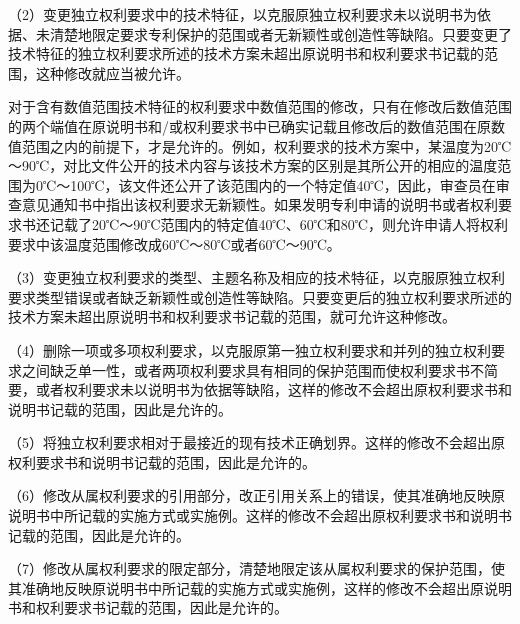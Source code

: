 {\setlength{\parindent}{17.1bp}（2）变更独立权利要求中的技术特征，以克服原独立权利要求未以说明书为依据、未清楚地限定要求专利保护的范围或者无新颖性或创造性等缺陷。只要变更了技术特征的独立权利要求所述的技术方案未超出原说明书和权利要求书记载的范围，这种修改就应当被允许。\par}

对于含有数值范围技术特征的权利要求中数值范围的修改，只有在修改后数值范围的两个端值在原说明书和/或权利要求书中已确实记载且修改后的数值范围在原数值范围之内的前提下，才是允许的。例如，权利要求的技术方案中，某温度为20℃～90℃，对比文件公开的技术内容与该技术方案的区别是其所公开的相应的温度范围为0℃～100℃，该文件还公开了该范围内的一个特定值40℃，因此，审查员在审查意见通知书中指出该权利要求无新颖性。如果发明专利申请的说明书或者权利要求书还记载了20℃～90℃范围内的特定值40℃、60℃和80℃，则允许申请人将权利要求中该温度范围修改成60℃～80℃或者60℃～90℃。

{\setlength{\parindent}{17.1bp}（3）变更独立权利要求的类型、主题名称及相应的技术特征，以克服原独立权利要求类型错误或者缺乏新颖性或创造性等缺陷。只要变更后的独立权利要求所述的技术方案未超出原说明书和权利要求书记载的范围，就可允许这种修改。\par}

{\setlength{\parindent}{17.1bp}（4）删除一项或多项权利要求，以克服原第一独立权利要求和并列的独立权利要求之间缺乏单一性，或者两项权利要求具有相同的保护范围而使权利要求书不简要，或者权利要求未以说明书为依据等缺陷，这样的修改不会超出原权利要求书和说明书记载的范围，因此是允许的。\par}

{\setlength{\parindent}{17.1bp}（5）将独立权利要求相对于最接近的现有技术正确划界。这样的修改不会超出原权利要求书和说明书记载的范围，因此是允许的。\par}

{\setlength{\parindent}{17.1bp}（6）修改从属权利要求的引用部分，改正引用关系上的错误，使其准确地反映原说明书中所记载的实施方式或实施例。这样的修改不会超出原权利要求书和说明书记载的范围，因此是允许的。\par}

{\setlength{\parindent}{17.1bp}（7）修改从属权利要求的限定部分，清楚地限定该从属权利要求的保护范围，使其准确地反映原说明书中所记载的实施方式或实施例，这样的修改不会超出原说明书和权利要求书记载的范围，因此是允许的。\par}


